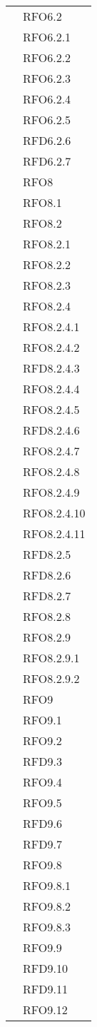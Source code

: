 \begin{longtable}{ p{12cm} | p{4cm} }
& RFO6.2 \\
& RFO6.2.1 \\
& RFO6.2.2 \\
& RFO6.2.3 \\
& RFO6.2.4 \\
& RFO6.2.5 \\
& RFD6.2.6 \\
& RFD6.2.7 \\
& RFO8 \\
& RFO8.1 \\
& RFO8.2 \\
& RFO8.2.1 \\
& RFO8.2.2 \\
& RFO8.2.3 \\
& RFO8.2.4 \\
& RFO8.2.4.1 \\
& RFO8.2.4.2 \\
& RFD8.2.4.3 \\
& RFO8.2.4.4 \\
& RFO8.2.4.5 \\
& RFD8.2.4.6 \\
& RFO8.2.4.7 \\
& RFO8.2.4.8 \\
& RFO8.2.4.9 \\
& RFO8.2.4.10 \\
& RFO8.2.4.11 \\
& RFD8.2.5 \\
& RFD8.2.6 \\
& RFD8.2.7 \\
& RFO8.2.8 \\
& RFO8.2.9 \\
& RFO8.2.9.1 \\
& RFO8.2.9.2 \\
& RFO9 \\
& RFO9.1 \\
& RFO9.2 \\
& RFD9.3 \\
& RFO9.4 \\
& RFO9.5 \\
& RFD9.6\\
& RFD9.7 \\
& RFO9.8 \\
& RFO9.8.1 \\
& RFO9.8.2 \\
& RFO9.8.3 \\
& RFO9.9 \\
& RFD9.10 \\
& RFD9.11 \\
& RFO9.12 \\

\end{longtable}
